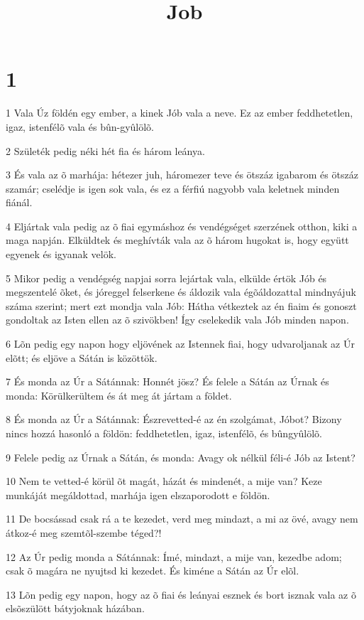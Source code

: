 

\title{Job}


\chapter{1}

\par 1 Vala Úz földén egy ember, a kinek Jób vala a neve. Ez az ember feddhetetlen, igaz, istenfélõ vala és bûn-gyûlölõ.
\par 2 Születék pedig néki hét fia és három leánya.
\par 3 És vala az õ marhája: hétezer juh, háromezer teve és ötszáz igabarom és ötszáz szamár; cselédje is igen sok vala, és ez a férfiú nagyobb vala keletnek minden fiánál.
\par 4 Eljártak vala pedig az õ fiai egymáshoz és vendégséget szerzének otthon, kiki a maga napján. Elküldtek és meghívták vala az õ három hugokat is, hogy együtt egyenek és igyanak velök.
\par 5 Mikor pedig a vendégség napjai sorra lejártak vala, elkülde értök Jób és megszentelé õket, és jóreggel felserkene és áldozik vala égõáldozattal mindnyájuk száma szerint; mert ezt mondja vala Jób: Hátha vétkeztek az én fiaim és gonoszt gondoltak az Isten ellen az õ szivökben! Így cselekedik vala Jób minden napon.
\par 6 Lõn pedig egy napon hogy eljövének az Istennek fiai, hogy udvaroljanak az Úr elõtt; és eljöve a Sátán is közöttök.
\par 7 És monda az Úr a Sátánnak: Honnét jösz? És felele a Sátán az Úrnak és monda: Körülkerültem és át meg át jártam a földet.
\par 8 És monda az Úr a Sátánnak: Észrevetted-é az én szolgámat, Jóbot? Bizony nincs hozzá hasonló a földön: feddhetetlen, igaz, istenfélõ, és bûngyûlölõ.
\par 9 Felele pedig az Úrnak a Sátán, és monda: Avagy ok nélkül féli-é Jób az Istent?
\par 10 Nem te vetted-é körül õt magát, házát és mindenét, a mije van? Keze munkáját megáldottad, marhája igen elszaporodott e földön.
\par 11 De bocsássad csak rá a te kezedet, verd meg mindazt, a mi az övé, avagy nem átkoz-é meg szemtõl-szembe téged?!
\par 12 Az Úr pedig monda a Sátánnak: Ímé, mindazt, a mije van, kezedbe adom; csak õ magára ne nyujtsd ki kezedet. És kiméne a Sátán az Úr elõl.
\par 13 Lõn pedig egy napon, hogy az õ fiai és leányai esznek és bort isznak vala az õ elsõszülött bátyjoknak házában.
